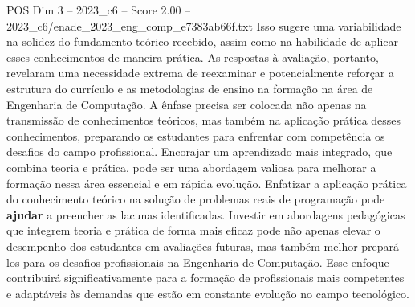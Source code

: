 \begin{textsample}{POS Dim 3 – 2023\_c6 – Score 2.00 – 2023\_c6/enade\_2023\_eng\_comp\_e7383ab66f.txt}
Isso sugere uma variabilidade na solidez do fundamento teórico recebido, assim como na habilidade de aplicar esses conhecimentos de maneira prática.
As respostas à avaliação, portanto, revelaram uma necessidade extrema de reexaminar e potencialmente reforçar a estrutura do currículo e as metodologias de ensino na formação na área de Engenharia de Computação.
A ênfase precisa ser colocada não apenas na transmissão de conhecimentos teóricos, mas também na aplicação prática desses conhecimentos, preparando os estudantes para enfrentar com competência os desafios do campo profissional.
Encorajar um aprendizado mais integrado, que combina teoria e prática, pode ser uma abordagem valiosa para melhorar a formação nessa área essencial e em rápida evolução.
Enfatizar a aplicação prática do conhecimento teórico na solução de problemas reais de programação pode \textbf{ajudar} a preencher as lacunas identificadas.
Investir em abordagens pedagógicas que integrem teoria e prática de forma mais eficaz pode não apenas elevar o desempenho dos estudantes em avaliações futuras, mas também melhor prepará -los para os desafios profissionais na Engenharia de Computação.
Esse enfoque contribuirá significativamente para a formação de profissionais mais competentes e adaptáveis às demandas que estão em constante evolução no campo tecnológico.

\end{textsample}

